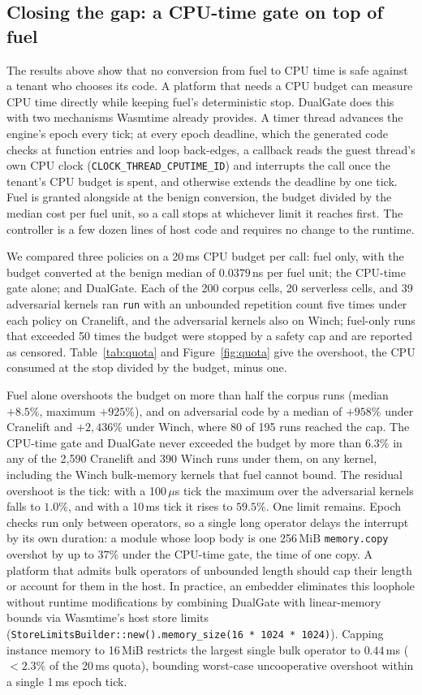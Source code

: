 \documentclass{ws-jcsc}
\begin{document}


\subsection{Closing the gap: a CPU-time gate on top of fuel}
\label{sec:dualgate}
The results above show that no conversion from fuel to CPU time is safe against a tenant who chooses its code. A platform that needs a CPU budget can measure CPU time directly while keeping fuel's deterministic stop. DualGate does this with two mechanisms Wasmtime already provides. A timer thread advances the engine's epoch every tick; at every epoch deadline, which the generated code checks at function entries and loop back-edges, a callback reads the guest thread's own CPU clock (\texttt{CLOCK\_THREAD\_CPUTIME\_ID}) and interrupts the call once the tenant's CPU budget is spent, and otherwise extends the deadline by one tick. Fuel is granted alongside at the benign conversion, the budget divided by the median cost per fuel unit, so a call stops at whichever limit it reaches first. The controller is a few dozen lines of host code and requires no change to the runtime.

We compared three policies on a 20\,ms CPU budget per call: fuel only, with the budget converted at the benign median of $0.0379$\,ns per fuel unit; the CPU-time gate alone; and DualGate. Each of the 200 corpus cells, 20 serverless cells, and 39 adversarial kernels ran \texttt{run} with an unbounded repetition count five times under each policy on Cranelift, and the adversarial kernels also on Winch; fuel-only runs that exceeded 50 times the budget were stopped by a safety cap and are reported as censored. Table~\ref{tab:quota} and Figure~\ref{fig:quota} give the overshoot, the CPU consumed at the stop divided by the budget, minus one.

Fuel alone overshoots the budget on more than half the corpus runs (median $+8.5\%$, maximum $+925\%$), and on adversarial code by a median of $+958\%$ under Cranelift and $+2{,}436\%$ under Winch, where 80 of 195 runs reached the cap. The CPU-time gate and DualGate never exceeded the budget by more than $6.3\%$ in any of the 2{,}590 Cranelift and 390 Winch runs under them, on any kernel, including the Winch bulk-memory kernels that fuel cannot bound. The residual overshoot is the tick: with a 100\,$\mu$s tick the maximum over the adversarial kernels falls to $1.0\%$, and with a 10\,ms tick it rises to $59.5\%$. One limit remains. Epoch checks run only between operators, so a single long operator delays the interrupt by its own duration: a module whose loop body is one 256\,MiB \texttt{memory.copy} overshot by up to $37\%$ under the CPU-time gate, the time of one copy. A platform that admits bulk operators of unbounded length should cap their length or account for them in the host. In practice, an embedder eliminates this loophole without runtime modifications by combining DualGate with linear-memory bounds via Wasmtime's host store limits (\texttt{StoreLimitsBuilder::new().memory\_size(16 * 1024 * 1024)}). Capping instance memory to 16\,MiB restricts the largest single bulk operator to $0.44$\,ms ($<2.3\%$ of the 20\,ms quota), bounding worst-case uncooperative overshoot within a single 1\,ms epoch tick.
\end{document}
